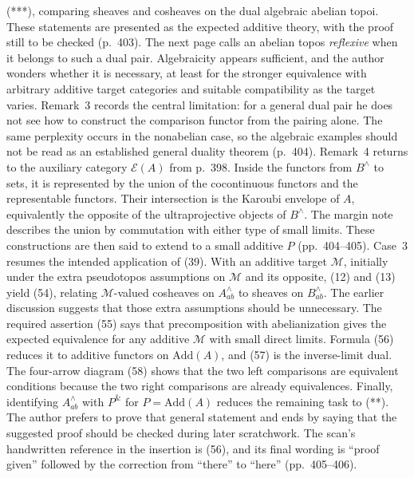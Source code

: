 \documentclass[10pt,oneside]{book}
\begin{document}
(***), comparing sheaves and cosheaves on the dual algebraic abelian topoi. These statements are presented as the expected additive theory, with the proof still to be checked (p.\ 403). The next page calls an abelian topos \emph{reflexive} when it belongs to such a dual pair. Algebraicity appears sufficient, and the author wonders whether it is necessary, at least for the stronger equivalence with arbitrary additive target categories and suitable compatibility as the target varies. Remark~3 records the central limitation: for a general dual pair he does not see how to construct the comparison functor from the pairing alone. The same perplexity occurs in the nonabelian case, so the algebraic examples should not be read as an established general duality theorem (p.\ 404). Remark~4 returns to the auxiliary category $\mathcal E(A)$ from p.\ 398. Inside the functors from $B^\wedge$ to sets, it is represented by the union of the cocontinuous functors and the representable functors. Their intersection is the Karoubi envelope of $A$, equivalently the opposite of the ultraprojective objects of $B^\wedge$. The margin note describes the union by commutation with either type of small limits. These constructions are then said to extend to a small additive $P$ (pp.\ 404--405). Case~3 resumes the intended application of (39). With an additive target $\mathcal M$, initially under the extra pseudotopos assumptions on $\mathcal M$ and its opposite, (12) and (13) yield (54), relating $\mathcal M$-valued cosheaves on $A^\wedge_{ab}$ to sheaves on $B^\wedge_{ab}$. The earlier discussion suggests that those extra assumptions should be unnecessary. The required assertion (55) says that precomposition with abelianization gives the expected equivalence for any additive $\mathcal M$ with small direct limits. Formula (56) reduces it to additive functors on $\mathrm{Add}(A)$, and (57) is the inverse-limit dual. The four-arrow diagram (58) shows that the two left comparisons are equivalent conditions because the two right comparisons are already equivalences. Finally, identifying $A^\wedge_{ab}$ with $P^{\&}$ for $P=\mathrm{Add}(A)$ reduces the remaining task to (**). The author prefers to prove that general statement and ends by saying that the suggested proof should be checked during later scratchwork. The scan's handwritten reference in the insertion is (56), and its final wording is “proof given” followed by the correction from “there” to “here” (pp.\ 405--406).
\end{document}

